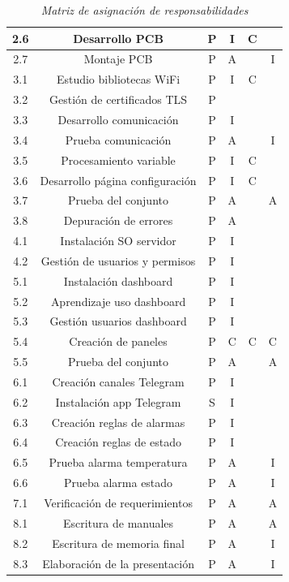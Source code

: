 \documentclass[11pt]{charter}
\begin{document}
\begin{table}[htpb]
{\begin{tabular}{|c|c|c|c|c|c|}
 2.6&Desarrollo PCB  & P  & I & C &\\ \hline
 2.7&Montaje PCB  & P  & A &  & I\\ \hline
 3.1&Estudio bibliotecas WiFi  & P & I & C &\\ \hline
 3.2&Gestión de certificados TLS  & P &  &  &\\ \hline
 3.3&Desarrollo comunicación  & P & I &  &\\ \hline
 3.4&Prueba comunicación  & P & A &  & I\\ \hline
 3.5&Procesamiento variable  & P  & I & C &\\ \hline
 3.6&Desarrollo página configuración & P  & I & C &\\ \hline
 3.7&Prueba del conjunto  & P & A &  & A\\ \hline
 3.8&Depuración de errores  & P & A &  &\\ \hline
 4.1&Instalación SO servidor  & P & I &  &\\ \hline
 4.2&Gestión de usuarios y permisos & P & I &  &\\ \hline
 5.1&Instalación dashboard  & P & I &  &\\ \hline 
 5.2&Aprendizaje uso dashboard  & P & I &  &\\ \hline
 5.3&Gestión usuarios dashboard  & P & I &  &\\ \hline
 5.4&Creación de paneles  & P & C & C & C\\ \hline
 5.5&Prueba del conjunto  & P & A &  & A\\ \hline
 6.1&Creación canales Telegram  & P & I &  &\\ \hline
 6.2&Instalación app Telegram & S & I &  &  \\ \hline
 6.3&Creación reglas de alarmas & P & I &  &\\ \hline
 6.4&Creación reglas de estado & P & I &  &\\ \hline
 6.5&Prueba alarma temperatura & P & A &  & I\\ \hline
 6.6&Prueba alarma estado & P & A &  & I \\ \hline
 7.1&Verificación de requerimientos & P & A &  & A\\ \hline
 8.1&Escritura de manuales & P & A &  & A\\ \hline
 8.2&Escritura de memoria final & P & A &  & I\\ \hline
 8.3&Elaboración de la presentación & P & A &  & I\\ \hline

\end{tabular}%
}
\caption{\textit{Matriz de asignación de responsabilidades}}
\label{tab:resp}
\end{table}
\end{document}
